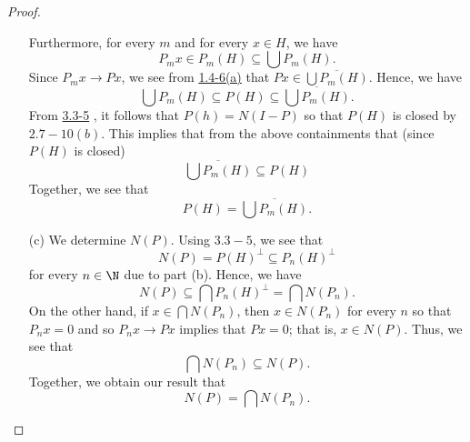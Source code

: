 \begin{proof}
\begin{enumerate}
            Furthermore, for every \( m  \) and for every \( x \in H  \), we have 
            \[  {P}_{m}x \in {P}_{m}(H) \subseteq \bigcup {P}_{m}(H). \]
            Since \( {P}_{m}x \to Px  \), we see from {\hyperref[1.4-6]{1.4-6(a)}} that \( Px \in \overline{\bigcup {P}_{m}(H) } \). Hence, we have 
            \[  \bigcup {P}_{m}(H) \subseteq P(H) \subseteq \overline{ \bigcup {P}_{m}(H) }. \]
            From {\hyperref[3.3-5]{3.3-5}} , it follows that \( P(h) = N(I - P) \) so that \( P(H) \) is closed by \( {\hyperref[2.7-10]{2.7-10(b)}}  \). This implies that from the above containments that (since \( P(H) \) is closed)
            \[ \overline{\bigcup {P}_{m}(H) } \subseteq P(H)  \]
            Together, we see that 
            \[ P(H) = \overline{\bigcup {P}_{m}(H) }.\]
        \item[(c)] We determine \( N(P)  \). Using \( {\hyperref[3.3-5]{3.3-5}}  \), we see that 
            \[  N(P) = P(H)^{\perp} \subseteq {P}_{n}(H)^{\perp} \] for every \( n \in \N \) due to part (b). Hence, we have 
            \[  N(P) \subseteq \bigcap {P}_{n}(H)^{\perp} = \bigcap N({P}_{n}).  \]
            On the other hand, if \( x \in \bigcap N({P}_{n}) \), then \( x \in N({P}_{n}) \) for every \( n  \) so that \( {P}_{n}x = 0  \) and so \( {P}_{n}x \to Px  \) implies that \( Px = 0  \); that is, \( x \in   N(P) \). Thus, we see that 
            \[ \bigcap N({P}_{n}) \subseteq N(P). \]
            Together, we obtain our result that 
            \[ N(P) = \bigcap N({P}_{n}). \]
            

    \end{enumerate}
    \end{proof}
